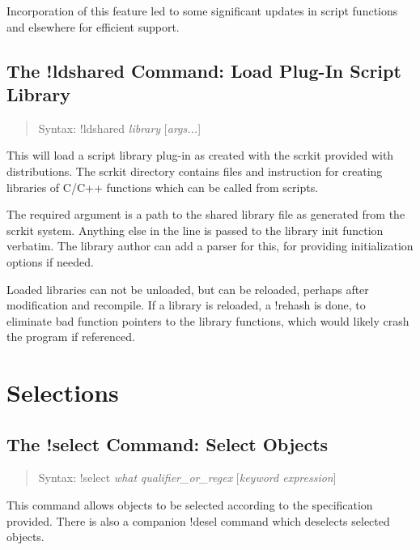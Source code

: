 Incorporation of this feature led to some significant updates in
script functions and elsewhere for efficient support.

\subsection{The {\cb !ldshared} Command: Load Plug-In Script Library}
\begin{quote}
Syntax: {\vt !ldshared} {\it library\/} [{\it args...\/}]
\end{quote}
This will load a script library plug-in as created with the {\vt
scrkit} provided with {\Xic} distributions.  The {\vt scrkit}
directory contains files and instruction for creating libraries of
C/C++ functions which can be called from scripts.

The required argument is a path to the shared library file as
generated from the {\vt scrkit} system.  Anything else in the line is
passed to the library {\vt init} function verbatim.  The library
author can add a parser for this, for providing initialization options
if needed.

Loaded libraries can not be unloaded, but can be reloaded, perhaps
after modification and recompile.  If a library is reloaded, a {\cb
!rehash} is done, to eliminate bad function pointers to the library
functions, which would likely crash the program if referenced.

\section{Selections}

\subsection{The {\cb !select} Command: Select Objects}
\begin{quote}
Syntax: {\vt !select} {\it what\/} {\it qualifier\_or\_regex}
 [{\it keyword expression}\/]
\end{quote}
This command allows objects to be selected according to the
specification provided.  There is also a companion {\cb !desel}
command which deselects selected objects.

